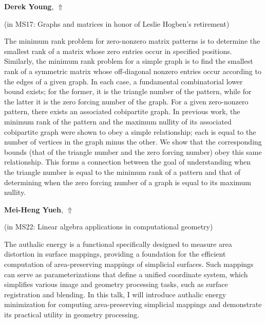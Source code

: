\documentclass[ILAS2025-program.tex]{subfiles}
\begin{document}
\hypertarget{down0224}{}\begin{ilasabstract}
    
\textbf{Derek Young},  \hfill \hyperlink{up0224}{$\Uparrow$}
    
    
(in {\color{mstitle}MS17: Graphs and matrices in honor of Leslie Hogben's retirement})
        
\mtskip
    The minimum rank problem for zero-nonzero matrix patterns is to determine the
smallest rank of a matrix whose zero entries occur in specified positions.
Similarly, the minimum rank problem for a simple graph is to find the smallest
rank of a symmetric matrix whose off-diagonal nonzero entries occur according
to the edges of a given graph.  In each case, a fundamental combinatorial lower
bound exists; for the former, it is the triangle number of the pattern, while
for the latter it is the zero forcing number of the graph.  For a given
zero-nonzero pattern, there exists an associated cobipartite graph.  In
previous work, the minimum rank of the pattern and the maximum nullity of its
associated cobipartite graph were shown to obey a simple relationship; each is
equal to the number of vertices in the graph minus the other.  We show that the
corresponding bounds (that of the triangle number and the zero forcing number)
obey this same relationship.  This forms a connection between the goal of
understanding when the triangle number is equal to the minimum rank of a
pattern and that of determining when the zero forcing number of a graph is
equal to its maximum nullity.

\end{ilasabstract}
    

\hypertarget{down0068}{}\begin{ilasabstract}
    
\textbf{Mei-Heng Yueh},  \hfill \hyperlink{up0068}{$\Uparrow$}
    
    
(in {\color{mstitle}MS22: Linear algebra applications in computational geometry})
        
\mtskip
    The authalic energy is a functional specifically designed to measure area distortion in surface mappings, providing a foundation for the efficient computation of area-preserving mappings of simplicial surfaces. Such mappings can serve as parameterizations that define a unified coordinate system, which simplifies various image and geometry processing tasks, such as surface registration and blending. In this talk, I will introduce authalic energy minimization for computing area-preserving simplicial mappings and demonstrate its practical utility in geometry processing.

\end{ilasabstract}
    
\end{document}
